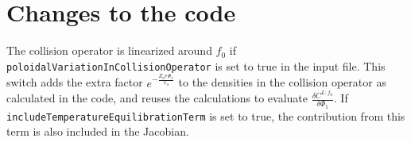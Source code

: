 \documentclass[12pt]{article}
\begin{document}
\section*{Changes to the code}
The collision operator is linearized around $f_0$ if \texttt{poloidalVariationInCollisionOperator} is set to true in the input file. This switch adds the extra factor $e^{-\frac{Z_a e\Phi_1}{T_a}}$ to the densities in the collision operator as calculated in the code, and reuses the calculations to evaluate $\frac{\delta C^{L:f_0}}{\delta \Phi_{1}}$. If \texttt{includeTemperatureEquilibrationTerm} is set to true, the contribution from this term is also included in the Jacobian. 
\end{document}
